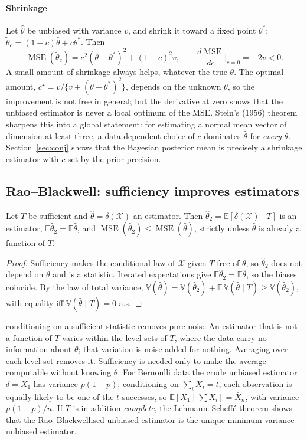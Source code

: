 \documentclass[11pt,a4paper]{article}
\newcommand{\E}{\mathbb{E}}
\newcommand{\V}{\mathbb{V}}
\newcommand{\MSE}{\operatorname{MSE}}
\newcommand{\Xbar}{\bar X_n}
\begin{document}
\paragraph{Shrinkage}
Let $\hat\theta$ be unbiased with variance $v$, and shrink it toward a fixed point $\theta^*$: $\tilde\theta_c=(1-c)\hat\theta+c\theta^*$. Then
\[
\MSE(\tilde\theta_c)=c^2(\theta-\theta^*)^2+(1-c)^2v,\qquad\frac{d\MSE}{dc}\Big|_{c=0}=-2v<0 .
\]
A small amount of shrinkage always helps, whatever the true $\theta$. The optimal amount, $c^\star=v/\{v+(\theta-\theta^*)^2\}$, depends on the unknown $\theta$, so the improvement is not free in general; but the derivative at zero shows that the unbiased estimator is never a local optimum of the MSE. Stein's (1956) theorem sharpens this into a global statement: for estimating a normal mean vector of dimension at least three, a data-dependent choice of $c$ dominates $\hat\theta$ for \emph{every} $\theta$. Section~\ref{sec:conj} shows that the Bayesian posterior mean is precisely a shrinkage estimator with $c$ set by the prior precision.

\subsection{Rao--Blackwell: sufficiency improves estimators}

\begin{theorem}\label{thm:rb}
Let $T$ be sufficient and $\hat\theta=\delta(\mathcal X)$ an estimator. Then $\hat\theta_2=\E[\delta(\mathcal X)\mid T]$ is an estimator, $\E\hat\theta_2=\E\hat\theta$, and $\MSE(\hat\theta_2)\le\MSE(\hat\theta)$, strictly unless $\hat\theta$ is already a function of $T$.
\end{theorem}

\begin{proof}
Sufficiency makes the conditional law of $\mathcal X$ given $T$ free of $\theta$, so $\hat\theta_2$ does not depend on $\theta$ and is a statistic. Iterated expectations give $\E\hat\theta_2=\E\hat\theta$, so the biases coincide. By the law of total variance, $\V(\hat\theta)=\V(\hat\theta_2)+\E\,\V(\hat\theta\mid T)\ge\V(\hat\theta_2)$, with equality iff $\V(\hat\theta\mid T)=0$ a.s.
\end{proof}

\begin{whybox}{conditioning on a sufficient statistic removes pure noise}
An estimator that is not a function of $T$ varies within the level sets of $T$, where the data carry no information about $\theta$; that variation is noise added for nothing. Averaging over each level set removes it. Sufficiency is needed only to make the average computable without knowing $\theta$. For Bernoulli data the crude unbiased estimator $\delta=X_1$ has variance $p(1-p)$; conditioning on $\sum_iX_i=t$, each observation is equally likely to be one of the $t$ successes, so $\E[X_1\mid\sum X_i]=\Xbar$, with variance $p(1-p)/n$. If $T$ is in addition \emph{complete}, the Lehmann--Scheff\'e theorem shows that the Rao--Blackwellised unbiased estimator is the unique minimum-variance unbiased estimator.
\end{whybox}
\end{document}
